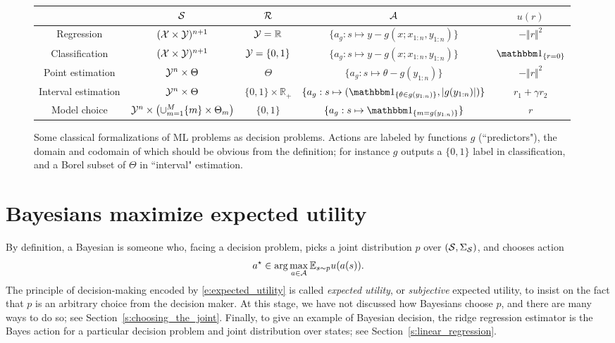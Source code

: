 \begin{figure}
    \centering
    \begin{tabular}{| c | c | c | c | c |}
        \hline
        & $\mathcal{S}$ & $\mathcal{R}$  & $\mathcal{A}$ & $u(r)$ \\
        \hline
        \hline
        Regression & $(\mathcal{X}\times \mathcal{Y})^{n+1}$& $\mathcal{Y}=\mathbb{R}$ &   
        $\{a_g:s\mapsto y-g(x;x_{1:n},y_{1:n})\}$ & $-\Vert r\Vert^2$ \\
        Classification & $(\mathcal{X}\times \mathcal{Y})^{n+1}$  &$\mathcal{Y}=\{0,1\}$ &   
        $\{a_g:s\mapsto y-g(x;x_{1:n},y_{1:n})\}$ & $\IND{r = 0}$ \\
        Point estimation & $\mathcal{Y}^n\times\Theta$ & $\Theta$& $\{a_g:s\mapsto \theta-g(y_{1:n})\}$ & $- \Vert r\Vert^2$\\
        Interval estimation & $\mathcal{Y}^n\times\Theta$ & $\{0,1\}\times \mathbb{R}_+$ & $\{a_g:s\mapsto (\IND{\theta\in g(y_{1:n})}, \vert g(y_{1:n})\vert)\}$ &  $r_1+\gamma r_2$ \\
        Model choice & $\mathcal{Y}^n\times \left (\cup_{m=1}^M \{m\}\times\Theta_m \right )$ &  $\{0,1\}$ & $\{a_g:s\mapsto \IND{m= g(y_{1:n})}\}$ & $r$ \\
        \hline
    \end{tabular}
    \label{f:decision_problems}
    \caption{Some classical formalizations of ML problems as decision problems. Actions are labeled by functions $g$ (``predictors"), the domain and codomain of which should be obvious from the definition; for instance $g$ outputs a $\{0,1\}$ label in classification, and a Borel subset of $\Theta$ in ``interval" estimation.}
\end{figure}

\section{Bayesians maximize expected utility}

By definition, a Bayesian is someone who, facing a decision problem, picks a joint distribution $p$ over $(\mathcal{S}, \Sigma_{\mathcal{S}})$, and chooses action
\begin{equation}
    a^\star \in \arg\max_{a\in\mathcal{A}} \mathbb{E}_{s\sim p} u(a(s)).
    \label{e:expected_utility}
\end{equation}
The principle of decision-making encoded by \eqref{e:expected_utility} is called \emph{expected utility}, or \emph{subjective} expected utility, to insist on the fact that $p$ is an arbitrary choice from the decision maker.
At this stage, we have not discussed how Bayesians choose $p$, and there are many ways to do so; see Section~\ref{s:choosing_the_joint}.
Finally, to give an example of Bayesian decision, the ridge regression estimator is the Bayes action for a particular decision problem and joint distribution over states; see Section~\ref{s:linear_regression}.

